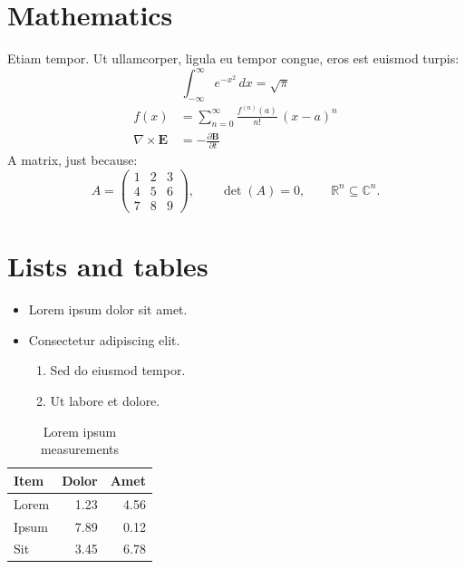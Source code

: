 \documentclass[11pt,a4paper]{article}
\begin{document}
\section{Mathematics}\label{sec:math}
Etiam tempor. Ut ullamcorper, ligula eu tempor congue, eros est euismod turpis:
\begin{equation}\label{eq:gauss}
  \int_{-\infty}^{\infty} e^{-x^2}\,dx = \sqrt{\pi}
\end{equation}
\begin{align}
  f(x) &= \sum_{n=0}^{\infty} \frac{f^{(n)}(a)}{n!}\,(x-a)^n \label{eq:taylor}\\
  \nabla \times \mathbf{E} &= -\frac{\partial \mathbf{B}}{\partial t}
\end{align}
A matrix, just because:
\[
  A = \begin{pmatrix} 1 & 2 & 3\\ 4 & 5 & 6\\ 7 & 8 & 9 \end{pmatrix},
  \qquad \det(A) = 0,
  \qquad \mathbb{R}^n \subseteq \mathbb{C}^n .
\]

\section{Lists and tables}\label{sec:lists}
\begin{itemize}
  \item Lorem ipsum dolor sit amet.
  \item Consectetur adipiscing elit.
  \begin{enumerate}
    \item Sed do eiusmod tempor.
    \item Ut labore et dolore.
  \end{enumerate}
\end{itemize}

\begin{table}[h]
  \centering
  \caption{Lorem ipsum measurements}\label{tab:lorem}
  \begin{tabular}{lrr}
    \toprule
    Item & Dolor & Amet \\
    \midrule
    Lorem & 1.23 & 4.56 \\
    Ipsum & 7.89 & 0.12 \\
    Sit   & 3.45 & 6.78 \\
    \bottomrule
  \end{tabular}
\end{table}
\end{document}
